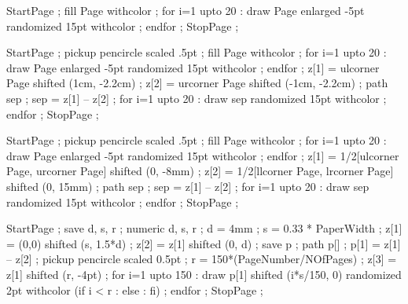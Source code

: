 \NormalHeight        {\textheight}
\PictureFrameHeight  {\textheight}




StartPage ;
fill Page withcolor  ;
for i=1 upto 20 :
 draw Page enlarged -5pt randomized 15pt withcolor  ;
endfor ;
StopPage ;
\stopuseMPgraphic

StartPage ;
pickup pencircle scaled .5pt ;
fill Page withcolor  ;
for i=1 upto 20 :
 draw Page enlarged -5pt randomized 15pt withcolor  ;
endfor ;
z[1] = ulcorner Page shifted (1cm, -2.2cm) ;
z[2] = urcorner Page shifted (-1cm, -2.2cm) ;
path sep ; sep = z[1] -- z[2] ;
for i=1 upto 20 :
 draw sep randomized 15pt withcolor  ;
endfor ;
StopPage ;
\stopuseMPgraphic

StartPage ;
pickup pencircle scaled .5pt ;
fill Page withcolor  ;
for i=1 upto 20 :
 draw Page enlarged -5pt randomized 15pt withcolor  ;
endfor ;
z[1] = 1/2[ulcorner Page, urcorner Page] shifted (0, -8mm) ;
z[2] = 1/2[llcorner Page, lrcorner Page] shifted (0, 15mm) ;
path sep ; sep = z[1] -- z[2] ;
for i=1 upto 20 :
 draw sep randomized 15pt withcolor  ;
endfor ;
StopPage ;
\stopuseMPgraphic

StartPage ;
save d, s, r ; numeric d, s, r ;
d = 4mm ;
s = 0.33 * PaperWidth ;
z[1] = (0,0) shifted (s, 1.5*d) ;
z[2] = z[1] shifted (0, d) ;
save p ; path p[] ;
p[1] = z[1] -- z[2] ;
pickup pencircle scaled 0.5pt ;
r = 150*(PageNumber/NOfPages) ;
z[3] = z[1] shifted (r, -4pt) ;
for i=1 upto 150 :
 draw p[1] shifted (i*s/150, 0) randomized 2pt withcolor 
 (if i < r : 
      else : 
      fi) ;
endfor ;
StopPage ;
\stopuseMPgraphic

